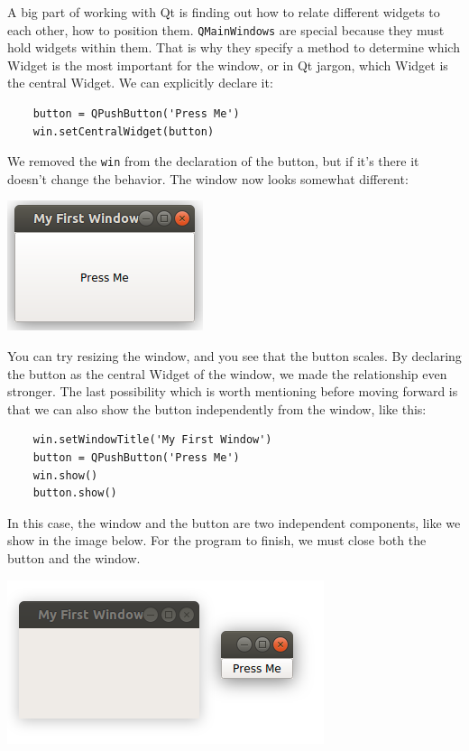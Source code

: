 A big part of working with Qt is finding out how to relate different widgets to each other, how to position them. \texttt{QMainWindows} are special because they must hold widgets within them. That is why they specify a method to determine which Widget is the most important for the window, or in Qt jargon, which Widget is the central Widget. We can explicitly declare it:

\begin{verbatim}
    button = QPushButton('Press Me')
    win.setCentralWidget(button)
\end{verbatim}

We removed the \texttt{win} from the declaration of the button, but if it's there it doesn't change the behavior. The window now looks somewhat different:

\begin{center}
    \includegraphics[width=.3\textwidth]{images/Chapter_08/03_simple_window_and_central_widget.png}
\end{center}

You can try resizing the window, and you see that the button scales. By declaring the button as the central Widget of the window, we made the relationship even stronger. The last possibility which is worth mentioning before moving forward is that we can also show the button independently from the window, like this:

\begin{verbatim}
    win.setWindowTitle('My First Window')
    button = QPushButton('Press Me')
    win.show()
    button.show()
\end{verbatim}

In this case, the window and the button are two independent components, like we show in the image below. For the program to finish, we must close both the button and the window.

\begin{center}
    \includegraphics[width=.3\textwidth]{images/Chapter_08/04_window_button_separated.png}
\end{center}

